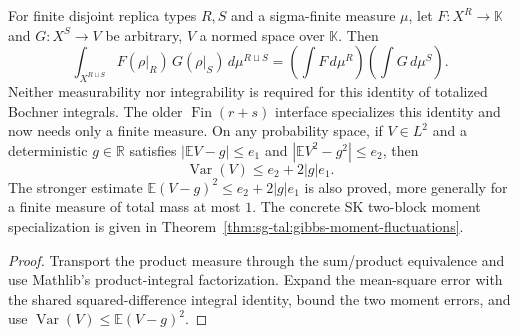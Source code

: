 \begin{lemma}
\label{lem:sg-tal:disjoint-block-variance-preparation}
\leanok
{}
For finite disjoint replica types $R,S$ and a sigma-finite measure $\mu$, let
$F:X^R\to\mathbb K$ and $G:X^S\to V$ be arbitrary, $V$ a normed space over $\mathbb K$. Then
\[
 \int_{X^{R\sqcup S}}F(\rho|_R)\,G(\rho|_S)\,d\mu^{R\sqcup S}
 =\left(\int F\,d\mu^R\right)\left(\int G\,d\mu^S\right).
\]
Neither measurability nor integrability is required for this
identity of totalized Bochner integrals. The older $\operatorname{Fin}(r+s)$ interface
specializes this identity and now needs only a finite measure.
On any probability space, if $V\in L^2$ and a deterministic $g\in\mathbb R$ satisfies
$|\mathbb E V-g|\le e_1$ and $|\mathbb E V^2-g^2|\le e_2$, then
\[
 \operatorname{Var}(V)\le e_2+2|g|e_1.
\]
The stronger estimate $\mathbb E(V-g)^2\le e_2+2|g|e_1$ is also proved, more generally for a finite measure of total
mass at most $1$.
The concrete SK two-block moment specialization is given in
Theorem~\ref{thm:sg-tal:gibbs-moment-fluctuations}.
\end{lemma}
\begin{proof}
\leanok
Transport the product measure through the sum/product equivalence and use Mathlib's
product-integral factorization. Expand the mean-square error with the shared
squared-difference integral identity, bound the two moment errors, and use
$\operatorname{Var}(V)\le\mathbb E(V-g)^2$.
\end{proof}


